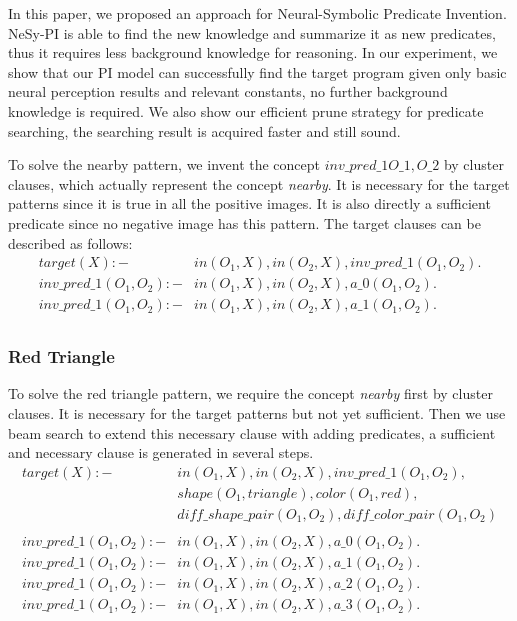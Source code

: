 \documentclass[
]{ceurart}
\begin{document}
In this paper, we proposed an approach for Neural-Symbolic Predicate Invention. NeSy-PI is able to find the new knowledge and summarize it as new predicates, thus it requires less background knowledge for reasoning.
In our experiment, we show that our PI model can successfully find the target program given only basic neural perception results and relevant constants, no further background knowledge is required. We also show our efficient prune strategy for predicate searching, the searching result is acquired faster and still sound.






To solve the nearby pattern, we invent the concept $ inv\_pred\_1O\_1, O\_2 $ by cluster clauses, which actually represent the concept \textit{nearby}. It is necessary for the target patterns since it is true in all the positive images. It is also directly a sufficient predicate since no negative image has this pattern. The target clauses can be described as follows:
\begin{align*}
	target(X) :- & in(O_1,X),in(O_2,X), inv\_pred\_1(O_1,O_2).\\
	inv\_pred\_1(O_1, O_2) :- 	& in(O_1,X), in(O_2,X), a\_0(O_1,O_2).\\
	inv\_pred\_1(O_1, O_2) :- 	& in(O_1,X), in(O_2,X), a\_1(O_1,O_2).\\									
\end{align*}

\subsubsection{Red Triangle}
To solve the red triangle pattern, we require the concept \textit{nearby} first by cluster clauses. It is necessary for the target patterns but not yet sufficient. Then we use beam search to extend this necessary clause with adding predicates, a sufficient and necessary clause is generated in several steps.
\begin{align*}
	target(X) :- & in(O_1,X),in(O_2,X), inv\_pred\_1(O_1,O_2), \\
						& shape(O_1, triangle), color(O_1, red), \\
						& diff\_shape\_pair(O_1,O_2), diff\_color\_pair(O_1,O_2)\\
	\\
	inv\_pred\_1(O_1, O_2) :- 	& in(O_1,X), in(O_2,X), a\_0(O_1,O_2).\\
	inv\_pred\_1(O_1, O_2) :- 	& in(O_1,X), in(O_2,X), a\_1(O_1,O_2).\\		
	inv\_pred\_1(O_1, O_2) :- 	& in(O_1,X), in(O_2,X), a\_2(O_1,O_2).\\																
	inv\_pred\_1(O_1, O_2) :- 	& in(O_1,X), in(O_2,X), a\_3(O_1,O_2).\\									
\end{align*}
\end{document}
